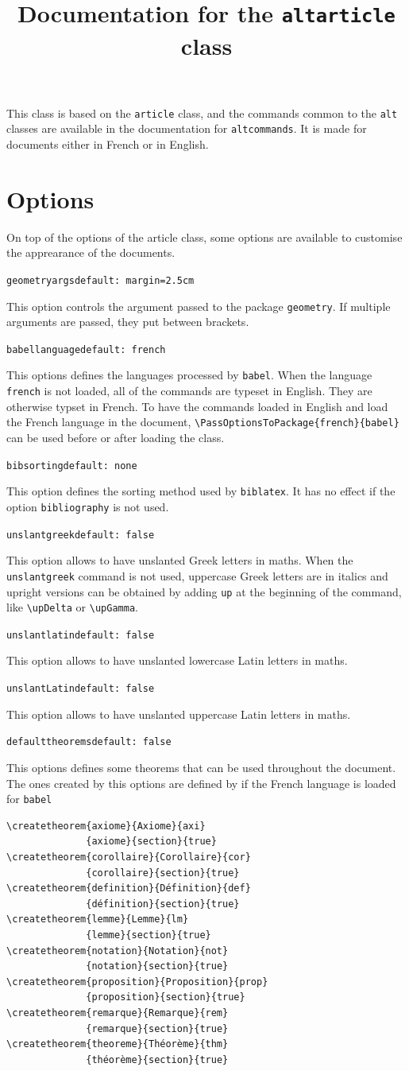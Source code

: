 \documentclass[12pt, babellanguage=british, titlespace, defaulttheorems]{altarticle}
\title{Documentation for the \texttt{altarticle} class}
\date{}
\newcommand{\optionline}[2][]{\par\medskip\hspace*{-.75cm}\texttt{#2}\hfill\if\relax\detokenize{#1}\relax\else\texttt{default:~#1}\fi\par}
\begin{document}
\maketitle
\tableofcontents
\bigskip
This class is based on the \texttt{article} class, and the commands common to the \texttt{alt} classes are available in the documentation for \texttt{altcommands}. It is made for documents either in French or in English.
\section{Options}
On top of the options of the article class, some options are available to customise the apprearance of the documents.

\optionline[margin=2.5cm]{geometryargs}This option controls the argument passed to the package \texttt{geometry}. If multiple arguments are passed, they put between brackets.
\optionline[french]{babellanguage}This options defines the languages processed by \texttt{babel}. When the language \texttt{french} is not loaded, all of the commands are typeset in English. They are otherwise typset in French. To have the commands loaded in English and load the French language in the document, \texttt{\textbackslash PassOptionsToPackage\{french\}\{babel\}} can be used before or after loading the class.
\optionline[none]{bibsorting}This option defines the sorting method used by \texttt{biblatex}. It has no effect if the option \texttt{bibliography} is not used.
\optionline[false]{unslantgreek}This option allows to have unslanted Greek letters in maths. When the \texttt{unslantgreek} command is not used, uppercase Greek letters are in italics and upright versions can be obtained by adding \texttt{up} at the beginning of the command, like \texttt{\textbackslash upDelta} or \texttt{\textbackslash upGamma}.
\optionline[false]{unslantlatin}This option allows to have unslanted lowercase Latin letters in maths.
\optionline[false]{unslantLatin}This option allows to have unslanted uppercase Latin letters in maths.
\optionline[false]{defaulttheorems}This options defines some theorems that can be used throughout the document. The ones created by this options are defined by
if the French language is loaded for \texttt{babel}
\begin{verbatim}
\createtheorem{axiome}{Axiome}{axi}
              {axiome}{section}{true}
\createtheorem{corollaire}{Corollaire}{cor}
              {corollaire}{section}{true}
\createtheorem{definition}{Définition}{def}
              {définition}{section}{true}
\createtheorem{lemme}{Lemme}{lm}
              {lemme}{section}{true}
\createtheorem{notation}{Notation}{not}
              {notation}{section}{true}
\createtheorem{proposition}{Proposition}{prop}
              {proposition}{section}{true}
\createtheorem{remarque}{Remarque}{rem}
              {remarque}{section}{true}
\createtheorem{theoreme}{Théorème}{thm}
              {théorème}{section}{true}
\end{verbatim}
\end{document}
